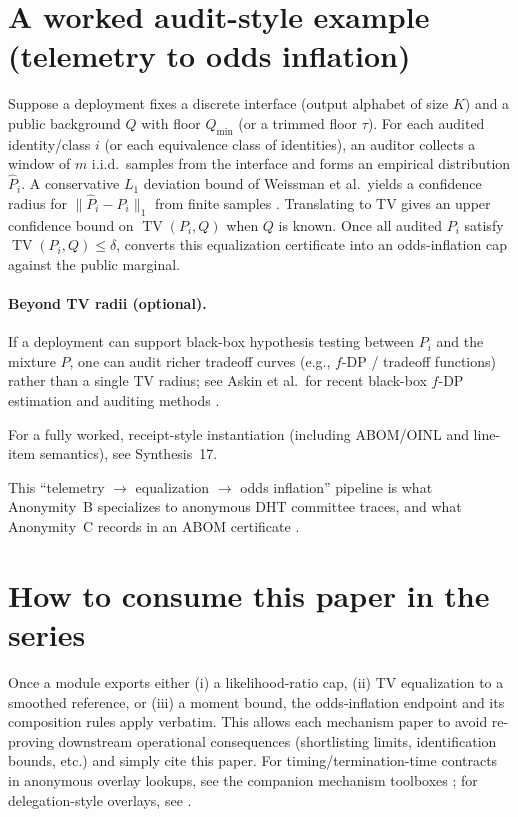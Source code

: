 \documentclass[11pt]{article}
\DeclareMathOperator{\TV}{TV}
\theoremstyle{definition}
\theoremstyle{remark}
\begin{document}
\section{A worked audit-style example (telemetry to odds inflation)}\label{sec:worked_example}
Suppose a deployment fixes a discrete interface (output alphabet of size $K$) and a public background $Q$ with floor $Q_{\min}$ (or a trimmed floor $\tau$).
For each audited identity/class $i$ (or each equivalence class of identities), an auditor collects a window of $m$ i.i.d.\ samples from the interface and forms an empirical distribution $\widehat P_i$.
A conservative $L_1$ deviation bound of Weissman et al.\ yields a confidence radius for $\|\widehat P_i-P_i\|_1$ from finite samples \cite{Weissman2003L1}.
Translating to TV gives an upper confidence bound on $\TV(P_i,Q)$ when $Q$ is known.
Once all audited $P_i$ satisfy $\TV(P_i,Q)\le\delta$,  converts this equalization certificate into an odds-inflation cap against the public marginal.

\paragraph{Beyond TV radii (optional).}
If a deployment can support black-box hypothesis testing between $P_i$ and the mixture $P$, one can audit richer tradeoff curves (e.g., $f$-DP / tradeoff functions) rather than a single TV radius; see Askin et al.\ for recent black-box $f$-DP estimation and auditing methods \cite{AskinUSENIXSecurity2025}.

For a fully worked, receipt-style instantiation (including ABOM/OINL and line-item semantics), see Synthesis~17.\cite{series:workedexample}

This ``telemetry $\rightarrow$ equalization $\rightarrow$ odds inflation'' pipeline is what Anonymity~B specializes to anonymous DHT committee traces, and what Anonymity~C records in an ABOM certificate \cite{series:profiling,series:abomoinl}.

\section{How to consume this paper in the series}
Once a module exports either (i) a likelihood-ratio cap, (ii) TV equalization to a smoothed reference, or (iii) a moment bound,
the odds-inflation endpoint and its composition rules apply verbatim.
This allows each mechanism paper to avoid re-proving downstream operational consequences (shortlisting limits, identification bounds, etc.) and simply cite this paper.
For timing/termination-time contracts in anonymous overlay lookups, see the companion mechanism toolboxes \cite{series:schedcompiler,series:prefixcapacities}; for delegation-style overlays, see \cite{series:spectral}.
\end{document}
